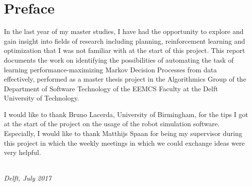 \chapter*{Preface}


In the last year of my master studies, I have had the opportunity to explore and gain insight into fields of research including planning, reinforcement learning and optimization that I was not familiar with at the start of this project.
This report documents the work on identifying the possibilities of automating the task of learning performance-maximizing Markov Decision Processes from data effectively, performed as a master thesis project in the Algorithmics Group of the Department of Software Technology of the EEMCS Faculty at the Delft University of Technology.

I would like to thank Bruno Lacerda, University of Birmingham, for the tips I got at the start of the project on the usage of the robot simulation software.
Especially, I would like to thank Matthijs Spaan for being my supervisor during this project in which the weekly meetings in which we could exchange ideas were very helpful.

\begin{flushright}
{\makeatletter\itshape
    \@author \\
    Delft, July 2017
\makeatother}
\end{flushright}

%
%